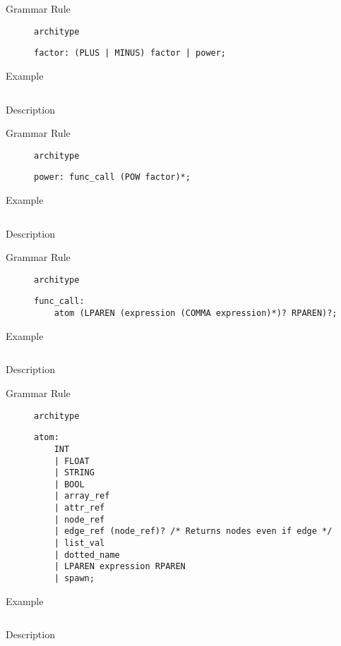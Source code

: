 \begin{description}
    \item[Grammar Rule] \texttt{architype}
          \begin{lstlisting}[style=gram]
factor: (PLUS | MINUS) factor | power;
\end{lstlisting}
    \item[Example] \texttt{}
          \begin{lstlisting}
    \end{lstlisting}

    \item[Description]
\end{description}


\begin{description}
    \item[Grammar Rule] \texttt{architype}
          \begin{lstlisting}[style=gram]
power: func_call (POW factor)*;
\end{lstlisting}
    \item[Example] \texttt{}
          \begin{lstlisting}
    \end{lstlisting}

    \item[Description]
\end{description}


\begin{description}
    \item[Grammar Rule] \texttt{architype}
          \begin{lstlisting}[style=gram]
func_call:
	atom (LPAREN (expression (COMMA expression)*)? RPAREN)?;
\end{lstlisting}
    \item[Example] \texttt{}
          \begin{lstlisting}
    \end{lstlisting}

    \item[Description]
\end{description}


\begin{description}
    \item[Grammar Rule] \texttt{architype}
          \begin{lstlisting}[style=gram]
atom:
	INT
	| FLOAT
	| STRING
	| BOOL
	| array_ref
	| attr_ref
	| node_ref
	| edge_ref (node_ref)? /* Returns nodes even if edge */
	| list_val
	| dotted_name
	| LPAREN expression RPAREN
	| spawn;
\end{lstlisting}
    \item[Example] \texttt{}
          \begin{lstlisting}
    \end{lstlisting}

    \item[Description]
\end{description}


